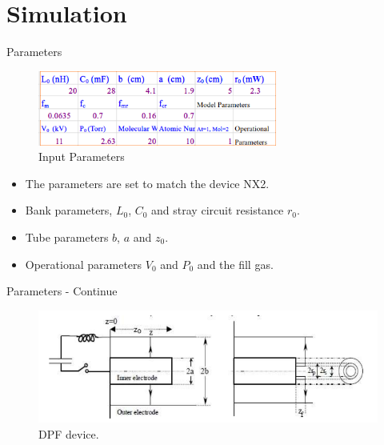 \section{Simulation}
\begin{frame} {Parameters}
    \begin{figure}
        \centering
        \includegraphics[width=0.7\textwidth]{figures/parameters.png}
        \caption{Input Parameters}
        \label{fig:parameters}
    \end{figure}
    \begin{itemize}
        \item The parameters are set to match the device NX2.
        \item Bank parameters, $L_0$, $C_0$ and stray circuit resistance $r_0$.
        \item Tube parameters $b$, $a$ and $z_0$.
        \item Operational parameters $V_0$ and $P_0$ and the fill gas.
    \end{itemize}
\end{frame}

\begin{frame} {Parameters - Continue}
    \begin{figure}
        \centering
        \includegraphics[width=\textwidth]{figures/dpf-device.png}
        \caption{DPF device.}
        \label{fig:dpf-device}
    \end{figure}
\end{frame}

